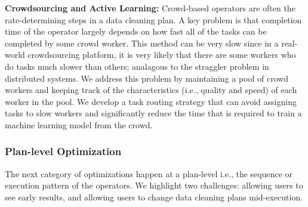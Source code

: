 
\vspace{.5em}
{\noindent \bf Crowdsourcing and Active Learning:} Crowd-based operators are often the rate-determining steps in a data cleaning plan.
A key problem is that completion time of the operator largely depends on how fast all of the tasks can be completed by some crowd worker.
This method can be very slow since in a real-world crowdsourcing platform, it is very likely that there are some workers who do tasks much slower than others; analagous to the straggler problem in distributed systems.
We address this problem by maintaining a pool of crowd workers and keeping track of the characteristics (i.e., quality and speed) of each worker in the pool. We develop a task routing strategy that can avoid assigning tasks to slow workers and significantly reduce the time that is required to train a machine learning model from the crowd.


\subsubsection{Plan-level Optimization}
The next category of optimizations happen at a plan-level i.e., the sequence or execution pattern of the operators.
We highlight two challenges: allowing users to see early results, and allowing users to change data cleaning plans mid-execution.

